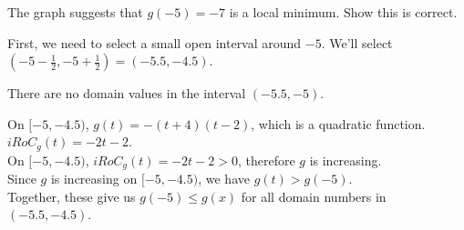 \documentclass{ximera}
\begin{document}
\begin{exercise}
The graph suggests that $g(-5) = -7$ is a local minimum.  Show this is correct. \\





\begin{explanation}



First, we need to select a small open interval around $-5$.  We'll select $\left( -5 - \frac{1}{2}, -5 + \frac{1}{2} \right) = (-5.5, -4.5)$.

There are no domain values in the interval $(-5.5, -5)$.

On $[-5, -4.5)$,  $g(t) = -(t+4)(t-2)$, which is a quadratic function.  $iRoC_g(t) = -2t - 2$. \\

On $[-5, -4.5)$, $iRoC_g(t) = -2t - 2 > 0$, therefore $g$ is increasing. \\

Since $g$ is increasing on $[-5, -4.5)$, we have $g(t) > g(-5)$. \\






Together, these give us $g(-5) \leq g(x)$ for all domain numbers in $(-5.5, -4.5)$.

\end{explanation}










\end{exercise}
\end{document}
